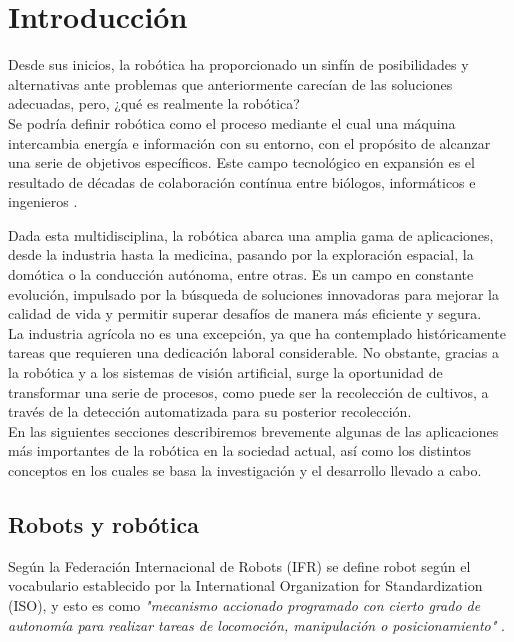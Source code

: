 \chapter{Introducción}
\label{cap:capitulo1}
\setcounter{page}{1}

Desde sus inicios, la robótica ha proporcionado un sinfín de posibilidades y alternativas ante problemas que anteriormente carecían de las soluciones adecuadas, pero, ¿qué es realmente la robótica?\\

Se podría definir robótica como el proceso mediante el cual una máquina intercambia energía e información con su entorno, con el propósito de alcanzar una serie de objetivos específicos. Este campo tecnológico en expansión es el resultado de décadas de colaboración contínua entre biólogos, informáticos e ingenieros \cite{Koditschek21}.

Dada esta multidisciplina, la robótica abarca una amplia gama de aplicaciones, desde la industria hasta la medicina, pasando por la exploración espacial, la domótica o la conducción autónoma, entre otras. Es un campo en constante evolución, impulsado por la búsqueda de soluciones innovadoras para mejorar la calidad de vida y permitir superar desafíos de manera más eficiente y segura.\\

La industria agrícola no es una excepción, ya que ha contemplado históricamente tareas que requieren una dedicación laboral considerable. No obstante, gracias a la robótica y a los sistemas de visión artificial, surge la oportunidad de transformar una serie de procesos, como puede ser la recolección de cultivos, a través de la detección automatizada para su posterior recolección.\\

En las siguientes secciones describiremos brevemente algunas de las aplicaciones más importantes de la robótica en la sociedad actual, así como los distintos conceptos en los cuales se basa la investigación y el desarrollo llevado a cabo.\\

\section{Robots y robótica}
\label{sec:robótica} %

Según la Federación Internacional de Robots (IFR) se define robot según el vocabulario establecido por la International Organization for Standardization (ISO), y esto es como \textit{"mecanismo accionado programado con cierto grado de autonomía para realizar tareas de locomoción, manipulación o posicionamiento"} \cite{ISO8373}.\\  

